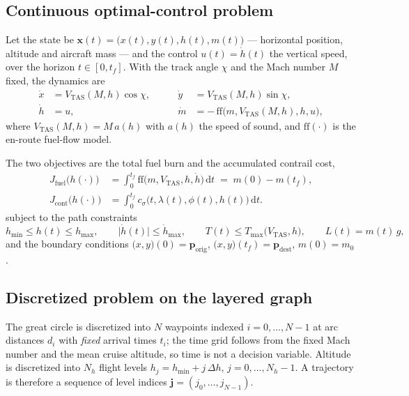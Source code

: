 \subsection{Continuous optimal-control problem}
\label{sec:cont}

Let the state be $\mathbf{x}(t)=\bigl(x(t),y(t),h(t),m(t)\bigr)$ --- horizontal
position, altitude and aircraft mass --- and the control $u(t)=\dot h(t)$ the
vertical speed, over the horizon $t\in[0,t_f]$. With the track angle $\chi$ and
the Mach number $M$ fixed, the dynamics are
%
\begin{equation}
  \begin{aligned}
    \dot x &= V_{\mathrm{TAS}}(M,h)\cos\chi, &\qquad
    \dot y &= V_{\mathrm{TAS}}(M,h)\sin\chi, \\
    \dot h &= u, &\qquad
    \dot m &= -\,\mathrm{ff}\bigl(m,V_{\mathrm{TAS}}(M,h),h,u\bigr),
  \end{aligned}
  \label{eq:dynamics}
\end{equation}
%
where $V_{\mathrm{TAS}}(M,h)=M\,a(h)$ with $a(h)$ the speed of sound, and
$\mathrm{ff}(\cdot)$ is the en-route fuel-flow model.

The two objectives are the total fuel burn and the accumulated contrail cost,
%
\begin{align}
  J_{\mathrm{fuel}}\bigl(h(\cdot)\bigr)
    &= \int_0^{t_f}\mathrm{ff}\bigl(m,V_{\mathrm{TAS}},h,\dot h\bigr)\,\mathrm{d}t
     \;=\; m(0)-m(t_f),
  \label{eq:Jfuel}\\[2pt]
  J_{\mathrm{cont}}\bigl(h(\cdot)\bigr)
    &= \int_0^{t_f} c_\sigma\bigl(t,\lambda(t),\phi(t),h(t)\bigr)\,\mathrm{d}t .
  \label{eq:Jcont}
\end{align}
%
subject to the path constraints
%
\begin{equation}
  h_{\min}\le h(t)\le h_{\max},\qquad
  \lvert\dot h(t)\rvert \le \dot h_{\max},\qquad
  T(t)\le T_{\max}\bigl(V_{\mathrm{TAS}},h\bigr),\qquad
  L(t)=m(t)\,g,
  \label{eq:path-constraints}
\end{equation}
%
and the boundary conditions $\bigl(x,y\bigr)(0)=\mathbf{p}_{\mathrm{orig}}$,
$\bigl(x,y\bigr)(t_f)=\mathbf{p}_{\mathrm{dest}}$, $m(0)=m_0$.

\subsection{Discretized problem on the layered graph}
\label{sec:disc}

The great circle is discretized into $N$ waypoints indexed $i=0,\dots,N-1$ at
arc distances $d_i$ with \emph{fixed} arrival times $t_i$; the time grid follows
from the fixed Mach number and the mean cruise altitude, so time is not a
decision variable. Altitude is discretized into $N_h$ flight levels
$h_j=h_{\min}+j\,\Delta h$, $j=0,\dots,N_h-1$. A trajectory is therefore a
sequence of level indices $\mathbf{j}=(j_0,\dots,j_{N-1})$.

